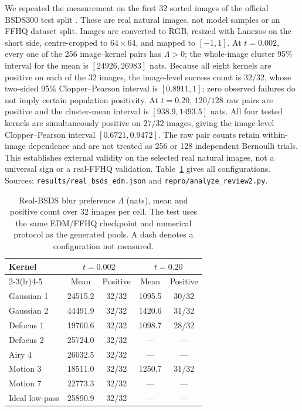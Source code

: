 \documentclass[10pt,journal]{IEEEtran}
\newcommand{\Lam}{\Lambda}
\begin{document}
We repeated the measurement on the first 32 sorted images of the official BSDS300 test split
\cite{martin2001bsds}. These are real natural images, not model samples or an FFHQ dataset split.
Images are converted to RGB, resized with Lanczos on the short side, centre-cropped to
$64\times64$, and mapped to $[-1,1]$. At $t=0.002$, every one of the 256 image--kernel pairs
has $\Lam>0$; the whole-image cluster 95\% interval for the mean is $[24926,26983]$ nats.
Because all eight kernels are positive on each of the 32 images, the image-level success count
is $32/32$, whose two-sided 95\% Clopper--Pearson interval is $[0.8911,1]$; zero observed
failures do not imply certain population positivity. At $t=0.20$, $120/128$ raw pairs are
positive and the cluster-mean interval is $[938.9,1493.5]$ nats. All four tested kernels are
simultaneously positive on $27/32$ images, giving the image-level Clopper--Pearson interval
$[0.6721,0.9472]$. The raw pair counts retain within-image dependence and are not treated as
256 or 128 independent Bernoulli trials. This establishes external validity on the selected real
natural images, not a universal sign or a real-FFHQ validation. Table~\ref{tab:real_bsds} gives
all configurations. Sources: \texttt{results/real\_bsds\_edm.json} and
\texttt{repro/analyze\_review2.py}.

\begin{table}[t]
  \centering
  \caption{Real-BSDS blur preference $\Lam$ (nats), mean and positive count over 32 images per
  cell. The test uses the same EDM/FFHQ checkpoint and numerical protocol as the generated pools.
  A dash denotes a configuration not measured.}
  \label{tab:real_bsds}
  \small
  \setlength{\tabcolsep}{3pt}
  \begin{tabular}{lcccc}
    \toprule
    Kernel & \multicolumn{2}{c}{$t=0.002$} & \multicolumn{2}{c}{$t=0.20$}\\
    \cmidrule(lr){2-3}\cmidrule(lr){4-5}
    & Mean & Positive & Mean & Positive\\
    \midrule
    Gaussian 1 & 24515.2 & 32/32 & 1095.5 & 30/32\\
    Gaussian 2 & 44491.9 & 32/32 & 1420.6 & 31/32\\
    Defocus 1 & 19760.6 & 32/32 & 1098.7 & 28/32\\
    Defocus 2 & 25724.0 & 32/32 & --- & ---\\
    Airy 4 & 26032.5 & 32/32 & --- & ---\\
    Motion 3 & 18511.0 & 32/32 & 1250.7 & 31/32\\
    Motion 7 & 22773.3 & 32/32 & --- & ---\\
    Ideal low-pass & 25890.9 & 32/32 & --- & ---\\
    \bottomrule
  \end{tabular}
\end{table}
\end{document}
